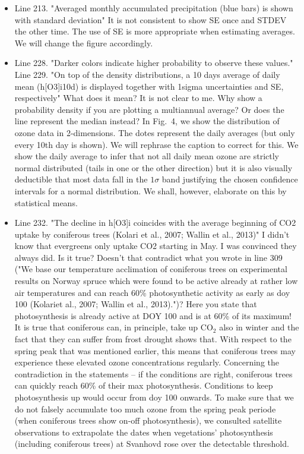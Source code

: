 \documentclass{scrartcl}
\begin{document}
\begin{itemize}
\item {\color{blue}Line 213. "Averaged monthly accumulated precipitation (blue bars) is shown with standard deviation" It is not consistent to show SE once and STDEV the other time. The use of SE is more appropriate when estimating averages.}
We will change the figure accordingly.

\item {\color{blue}Line 228. "Darker colors indicate higher probability to observe these values."\\Line 229. "On top of the density distributions, a 10 days average of daily mean (h[O3]i10d) is displayed together with 1sigma uncertainties and SE, respectively" What does it mean? It is not clear to me. Why show a probability density if you are plotting a multiannual average? Or does the line represent the median instead?} In Fig.~4, we show the distribution of ozone data in 2-dimensions. The dotes represent the daily averages (but only every 10th day is shown). We will rephrase the caption to correct for this. We show the daily average to infer that not all daily mean ozone are strictly normal distributed (tails in one or the other direction) but it is also visually deductible that most data fall in the $1\sigma$ band justifying the chosen confidence intervals for a normal distribution. We shall, however, elaborate on this by statistical means.  

\item {\color{blue}Line 232. "The decline in h[O3]i coincides with the average beginning of CO2 uptake by coniferous trees (Kolari et al., 2007; Wallin et al., 2013)" I didn't know that evergreens only uptake CO2 starting in May. I was convinced they always did. Is it true? Doesn't that contradict what you wrote in line 309 ("We base our temperature acclimation of coniferous trees on experimental results on Norway spruce which were found to be active already at rather low air temperatures and can reach 60\% photosynthetic activity as early as doy 100 (Kolariet al., 2007; Wallin et al., 2013).")? Here you state that photosynthesis is already active at DOY 100 and is at 60\% of its maximum!}
It is true that coniferous can, in principle, take up $\mathrm{CO_2}$ also in winter and the fact that they can suffer from frost drought shows that. With respect to the spring peak that was mentioned earlier, this means that coniferous trees may experience these elevated ozone concentrations regularly. Concerning the contradiction in the statements -- if the conditions are right, coniferous trees can quickly reach 60\% of their max photosynthesis. Conditions to keep photosynthesis up would occur from doy 100 onwards. To make sure that we do not falsely accumulate too much ozone from the spring peak periode (when coniferous trees show on-off photosynthesis), we consulted satellite observations to extrapolate the dates when vegetations' photosynthesis (including coniferous trees) at Svanhovd rose over the detectable threshold.


\end{itemize}
\end{document}
